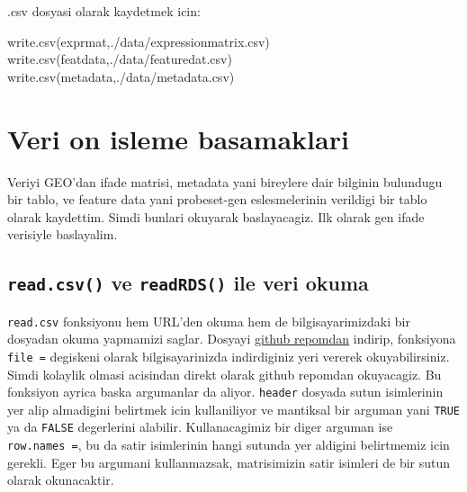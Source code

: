 \documentclass[
]{book}
\newenvironment{Shaded}{\begin{snugshade}}{\end{snugshade}}
\newcommand{\FunctionTok}[1]{\textcolor[rgb]{0.00,0.00,0.00}{#1}}
\newcommand{\NormalTok}[1]{#1}
\newcommand{\StringTok}[1]{\textcolor[rgb]{0.31,0.60,0.02}{#1}}
\begin{document}
.csv dosyasi olarak kaydetmek icin:

\begin{Shaded}
\begin{Highlighting}[]
\FunctionTok{write.csv}\NormalTok{(exprmat,}\StringTok{\textquotesingle{}./data/expressionmatrix.csv\textquotesingle{}}\NormalTok{)}
\FunctionTok{write.csv}\NormalTok{(featdata,}\StringTok{\textquotesingle{}./data/featuredat.csv\textquotesingle{}}\NormalTok{)}
\FunctionTok{write.csv}\NormalTok{(metadata,}\StringTok{\textquotesingle{}./data/metadata.csv\textquotesingle{}}\NormalTok{)}
\end{Highlighting}
\end{Shaded}

\hypertarget{veri-on-isleme-basamaklari}{%
\chapter{Veri on isleme basamaklari}\label{veri-on-isleme-basamaklari}}

Veriyi GEO'dan ifade matrisi, metadata yani bireylere dair bilginin bulundugu bir tablo, ve feature data yani probeset-gen eslesmelerinin verildigi bir tablo olarak kaydettim. Simdi bunlari okuyarak baslayacagiz. Ilk olarak gen ifade verisiyle baslayalim.

\hypertarget{read.csv-ve-readrds-ile-veri-okuma}{%
\section{\texorpdfstring{\texttt{read.csv()} ve \texttt{readRDS()} ile veri okuma}{read.csv() ve readRDS() ile veri okuma}}\label{read.csv-ve-readrds-ile-veri-okuma}}

\texttt{read.csv} fonksiyonu hem URL'den okuma hem de bilgisayarimizdaki bir dosyadan okuma yapmamizi saglar. Dosyayi \href{https://github.com/mdonertas/20210322_REgitim/tree/master/data}{github repomdan} indirip, fonksiyona \texttt{file\ =} degiskeni olarak bilgisayarinizda indirdiginiz yeri vererek okuyabilirsiniz. Simdi kolaylik olmasi acisindan direkt olarak github repomdan okuyacagiz. Bu fonksiyon ayrica baska argumanlar da aliyor. \texttt{header} dosyada sutun isimlerinin yer alip almadigini belirtmek icin kullaniliyor ve mantiksal bir arguman yani \texttt{TRUE} ya da \texttt{FALSE} degerlerini alabilir. Kullanacagimiz bir diger arguman ise \texttt{row.names\ =}, bu da satir isimlerinin hangi sutunda yer aldigini belirtmemiz icin gerekli. Eger bu argumani kullanmazsak, matrisimizin satir isimleri de bir sutun olarak okunacaktir.
\end{document}
